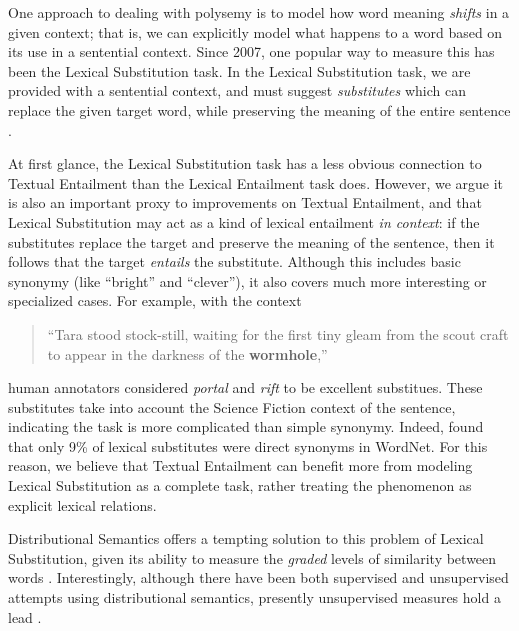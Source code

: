 \documentclass[12pt]{article}
\begin{document}
One approach to dealing with polysemy is to model how word
meaning {\em shifts} in a given context; that is, we can explicitly model what
happens to a word based on its use in a sentential context. Since 2007, one
popular way to measure this has been the Lexical Substitution task.  In the
Lexical Substitution task, we are provided with a sentential context,
and must suggest {\em substitutes} which can replace the given target word,
while preserving the meaning of the entire sentence
\cite{mccarthy:2007:semeval,biemann:2012:lrec,kremer:2014:eacl}.

At first glance, the Lexical Substitution task has a less obvious connection to
Textual Entailment than the Lexical Entailment task does. However, we argue
it is also an important proxy to improvements on Textual Entailment, and that
Lexical Substitution may act as a kind of lexical entailment {\em
in context}: if the substitutes replace the target and preserve the meaning of
the sentence, then it follows that the target {\em entails} the substitute.
Although this includes basic synonymy (like ``bright'' and ``clever''), it
also covers much more interesting or specialized cases. For example, with the
context
\begin{quote}
  ``Tara stood stock-still, waiting for the first tiny gleam from the
  scout craft to appear in the darkness of the {\bf wormhole},''
\end{quote}
human annotators considered {\em portal} and {\em rift} to be excellent
substitues. These substitutes take into account the Science Fiction context of the
sentence, indicating the task is more complicated than simple synonymy. Indeed,
 found that only 9\% of lexical substitutes were
direct synonyms in WordNet.  For this reason, we believe that Textual
Entailment can benefit more from modeling Lexical Substitution as a complete
task, rather treating the phenomenon as explicit lexical relations.

Distributional Semantics offers a tempting solution to this problem of Lexical
Substitution, given its ability to measure the {\em graded} levels of similarity
between words \cite{erk:2008:emnlp}. Interestingly, although there have been
both supervised \cite{biemann:2012:lrec,szarvas:2013:naacl} and unsupervised
attempts
\cite{erk:2008:emnlp,dinu:2010:emnlp,thater:2010:acl,vandecruys:2011:emnlp,kremer:2014:eacl,melamud:2015:naacl,melamud:2015:vsm,kawakami:2016:iclr,roller:2016:naacl}
using distributional semantics, presently unsupervised measures hold
a lead \cite{melamud:2015:naacl,melamud:2016:conll}.
\end{document}
